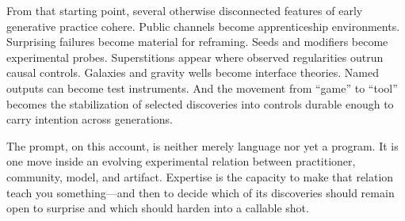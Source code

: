 \documentclass[11pt]{article}
\begin{document}
From that starting point, several otherwise disconnected features of early generative practice cohere. Public channels become apprenticeship environments. Surprising failures become material for reframing. Seeds and modifiers become experimental probes. Superstitions appear where observed regularities outrun causal controls. Galaxies and gravity wells become interface theories. Named outputs can become test instruments. And the movement from ``game'' to ``tool'' becomes the stabilization of selected discoveries into controls durable enough to carry intention across generations.

The prompt, on this account, is neither merely language nor yet a program. It is one move inside an evolving experimental relation between practitioner, community, model, and artifact. Expertise is the capacity to make that relation teach you something—and then to decide which of its discoveries should remain open to surprise and which should harden into a callable shot.
\end{document}
